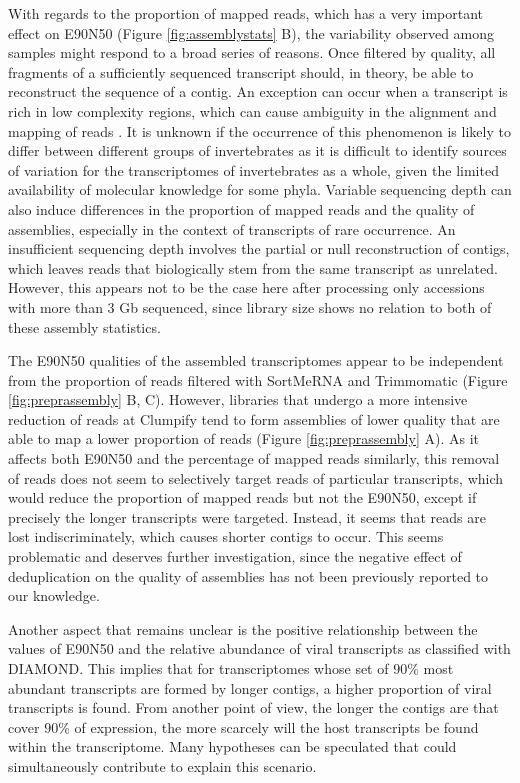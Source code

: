 \documentclass[
  openany]{book}
\begin{document}
With regards to the proportion of mapped reads, which has a very important effect on E90N50 (Figure \ref{fig:assemblystats} B), the variability observed among samples might respond to a broad series of reasons. Once filtered by quality, all fragments of a sufficiently sequenced transcript should, in theory, be able to reconstruct the sequence of a contig. An exception can occur when a transcript is rich in low complexity regions, which can cause ambiguity in the alignment and mapping of reads \autocite{Rado-Trilla2012}. It is unknown if the occurrence of this phenomenon is likely to differ between different groups of invertebrates as it is difficult to identify sources of variation for the transcriptomes of invertebrates as a whole, given the limited availability of molecular knowledge for some phyla. Variable sequencing depth can also induce differences in the proportion of mapped reads and the quality of assemblies, especially in the context of transcripts of rare occurrence. An insufficient sequencing depth involves the partial or null reconstruction of contigs, which leaves reads that biologically stem from the same transcript as unrelated. However, this appears not to be the case here after processing only accessions with more than 3 Gb sequenced, since library size shows no relation to both of these assembly statistics.

The E90N50 qualities of the assembled transcriptomes appear to be independent from the proportion of reads filtered with SortMeRNA and Trimmomatic (Figure \ref{fig:preprassembly} B, C). However, libraries that undergo a more intensive reduction of reads at Clumpify tend to form assemblies of lower quality that are able to map a lower proportion of reads (Figure \ref{fig:preprassembly} A). As it affects both E90N50 and the percentage of mapped reads similarly, this removal of reads does not seem to selectively target reads of particular transcripts, which would reduce the proportion of mapped reads but not the E90N50, except if precisely the longer transcripts were targeted. Instead, it seems that reads are lost indiscriminately, which causes shorter contigs to occur. This seems problematic and deserves further investigation, since the negative effect of deduplication on the quality of assemblies has not been previously reported to our knowledge.

Another aspect that remains unclear is the positive relationship between the values of E90N50 and the relative abundance of viral transcripts as classified with DIAMOND. This implies that for transcriptomes whose set of \(90\%\) most abundant transcripts are formed by longer contigs, a higher proportion of viral transcripts is found. From another point of view, the longer the contigs are that cover \(90\%\) of expression, the more scarcely will the host transcripts be found within the transcriptome. Many hypotheses can be speculated that could simultaneously contribute to explain this scenario.
\end{document}
